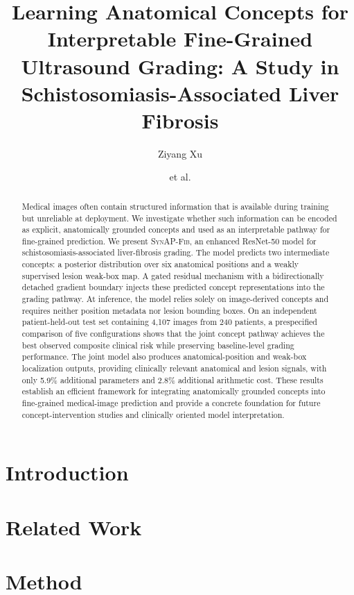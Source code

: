 \documentclass{article}
\title{Learning Anatomical Concepts for Interpretable Fine-Grained Ultrasound Grading: A Study in Schistosomiasis-Associated Liver Fibrosis}
\author{Ziyang Xu \and et al.}
\newcommand{\method}{\textsc{SynAP-Fib}}
\begin{document}
\maketitle
\begin{abstract}
Medical images often contain structured information that is available during training but unreliable at deployment. We investigate whether such information can be encoded as explicit, anatomically grounded concepts and used as an interpretable pathway for fine-grained prediction. We present \method, an enhanced ResNet-50 model for schistosomiasis-associated liver-fibrosis grading. The model predicts two intermediate concepts: a posterior distribution over six anatomical positions and a weakly supervised lesion weak-box map. A gated residual mechanism with a bidirectionally detached gradient boundary injects these predicted concept representations into the grading pathway. At inference, the model relies solely on image-derived concepts and requires neither position metadata nor lesion bounding boxes. On an independent patient-held-out test set containing 4,107 images from 240 patients, a prespecified comparison of five configurations shows that the joint concept pathway achieves the best observed composite clinical risk while preserving baseline-level grading performance. The joint model also produces anatomical-position and weak-box localization outputs, providing clinically relevant anatomical and lesion signals, with only 5.9\% additional parameters and 2.8\% additional arithmetic cost. These results establish an efficient framework for integrating anatomically grounded concepts into fine-grained medical-image prediction and provide a concrete foundation for future concept-intervention studies and clinically oriented model interpretation.\end{abstract}

\section{Introduction}
\label{sec:intro}

\section{Related Work}

\section{Method}
\label{sec:methods}




\end{document}
